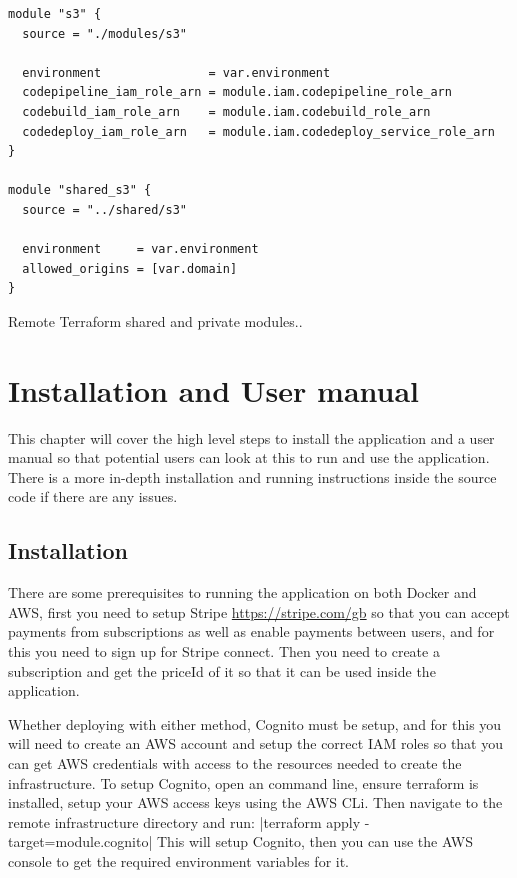 \documentclass[]{project_report}
\begin{document}
\begin{codeblock}[H]
    \begin{verbatim}
module "s3" {
  source = "./modules/s3"

  environment               = var.environment
  codepipeline_iam_role_arn = module.iam.codepipeline_role_arn
  codebuild_iam_role_arn    = module.iam.codebuild_role_arn
  codedeploy_iam_role_arn   = module.iam.codedeploy_service_role_arn
}

module "shared_s3" {
  source = "../shared/s3"

  environment     = var.environment
  allowed_origins = [var.domain]
}
\end{verbatim}
\caption{Remote Terraform shared and private modules..}
\label{code:terraformModules}
\end{codeblock}

\chapter{Installation and User manual}
\label{chapter:installation}

This chapter will cover the high level steps to install the application and a user manual so that potential users can look at this to run and use the application. There is a more in-depth installation and running instructions inside the source code if there are any issues.

\section{Installation}
There are some prerequisites to running the application on both Docker and AWS, first you need to setup Stripe \url{https://stripe.com/gb} so that you can accept payments from subscriptions as well as enable payments between users, and for this you need to sign up for Stripe connect. Then you need to create a subscription and get the priceId of it so that it can be used inside the application. 

Whether deploying with either method, Cognito must be setup, and for this you will need to create an AWS account and setup the correct IAM roles so that you can get AWS credentials with access to the resources needed to create the infrastructure. To setup Cognito, open an command line, ensure terraform is installed, setup your AWS access keys using the AWS CLi. Then navigate to the remote infrastructure directory and run: |terraform apply -target=module.cognito| This will setup Cognito, then you can use the AWS console to get the required environment variables for it.
\end{document}
